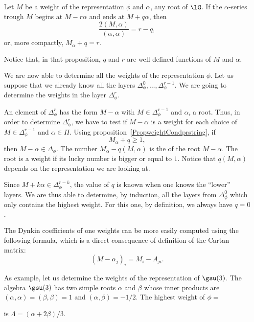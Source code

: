 \begin{proposition}     \label{PropweightCondprstring}
Let $M$ be a weight of the representation $\phi$ and $\alpha$, any root of $\lG$. If the $\alpha$-series trough $M$ begins at $M-r\alpha$ and ends at $M+q\alpha$, then
\begin{equation}
    \frac{ 2(M,\alpha) }{ (\alpha,\alpha) }=r-q,
\end{equation}
or, more compactly, $M_{\alpha}+q=r$.
\end{proposition}
Notice that, in that proposition, $q$ and $r$ are well defined functions of $M$ and $\alpha$.

We are now able to determine all the weights of the representation $\phi$. Let us suppose that we already know all the layers $\Delta_{\phi}^0,\ldots,\Delta_{\phi}^{r-1}$. We are going to determine the weights in the layer $\Delta_{\phi}^r$.

An element of $\Delta_{\phi}^r$ has the form $M-\alpha$ with $M\in\Delta_{\phi}^{r-1}$ and $\alpha$, a root. Thus, in order to determine $\Delta_{\phi}^r$, we have to test if $M-\alpha$ is a weight for each choice of $M\in\Delta_{\phi}^{r-1}$ and $\alpha\in\Pi$. Using proposition~\ref{PropweightCondprstring}, if
\begin{equation}
    M_{\alpha}+q \geq 1,
\end{equation}
then $M-\alpha\in\Delta_{\phi}$. The number $M_{\alpha}-q(M,\alpha)$ is the  of the root $M-\alpha$. The root is a weight if its lucky number is bigger or equal to $1$. Notice that $q(M,\alpha)$ depends on the representation we are looking at.

Since $M+k\alpha\in\Delta_{\phi}^{r-k}$, the value of $q$ is known when one knows the ``lower'' layers. We are thus able to determine, by induction, all the layers from $\Delta^0_{\phi}$ which only contains the highest weight. For this one, by definition, we always have $q=0$.

The Dynkin coefficients of one weights can be more easily computed using the following formula, which is a direct consequence of definition of the Cartan matrix:
\begin{equation}        \label{EqCoefDynkMalpha}
    (M-\alpha_j)_i=M_i-A_{ji}.
\end{equation}

As example, let us determine the weights of the representation  of \( \gsu(3)\).
%
The algebra $\gsu(3)$ has two simple roots $\alpha$ and $\beta$ whose inner products are $(\alpha,\alpha)=(\beta,\beta)=1$ and $(\alpha,\beta)=-1/2$. The highest weight of $\phi=$

is $\Lambda=(\alpha+2\beta)/3$.

